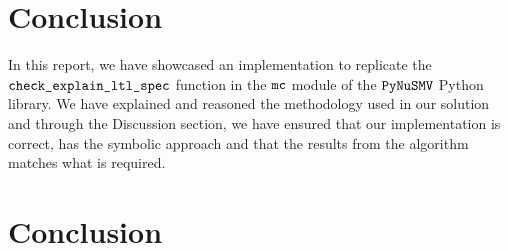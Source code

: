 \documentclass{article}
\begin{document}
\section{Conclusion}

In this report, we have showcased an implementation to replicate the $\verb|check_explain_ltl_spec|$ function in the $\verb|mc|$ module of the $\verb|PyNuSMV|$ Python library. We have explained and reasoned the methodology used in our solution and through the Discussion section, we have ensured that our implementation is correct, has the symbolic approach and that the results from the algorithm matches what is required.


\section{Conclusion}
\end{document}

